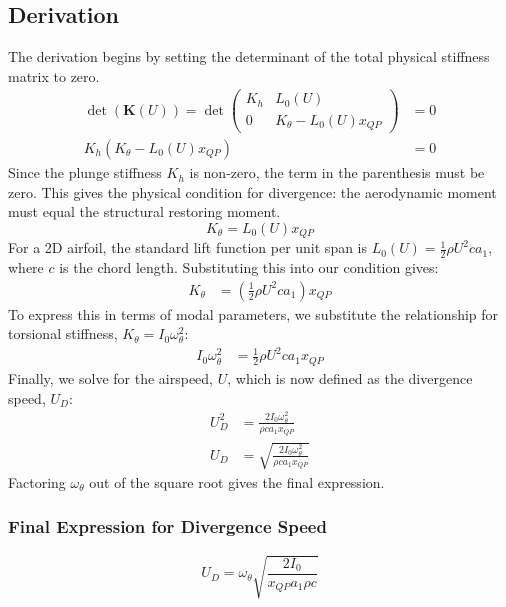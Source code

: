 \documentclass{article}
\begin{document}
\subsection{Derivation}
The derivation begins by setting the determinant of the total physical stiffness matrix to zero.
\begin{align*}
    \det(\mathbf{K}(U)) = \det \begin{pmatrix} K_h & L_0(U) \\ 0 & K_\theta - L_0(U) x_{QP} \end{pmatrix} &= 0 \\
    K_h(K_\theta - L_0(U) x_{QP}) &= 0
\end{align*}
Since the plunge stiffness $K_h$ is non-zero, the term in the parenthesis must be zero. This gives the physical condition for divergence: the aerodynamic moment must equal the structural restoring moment.
\begin{equation}
     K_\theta = L_0(U) x_{QP} \label{eq:divergence_condition_2}
\end{equation}
For a 2D airfoil, the standard lift function per unit span is $L_0(U) = \frac{1}{2}\rho U^2 c a_1$, where $c$ is the chord length. Substituting this into our condition gives:
\begin{align*}
    K_\theta &= \left(\frac{1}{2}\rho U^2 c a_1\right) x_{QP}
\end{align*}
To express this in terms of modal parameters, we substitute the relationship for torsional stiffness, $K_\theta = I_0 \omega_\theta^2$:
\begin{align*}
    I_0 \omega_\theta^2 &= \frac{1}{2}\rho U^2 c a_1 x_{QP}
\end{align*}
Finally, we solve for the airspeed, $U$, which is now defined as the divergence speed, $U_D$:
\begin{align*}
    U_D^2 &= \frac{2 I_0 \omega_\theta^2}{\rho c a_1 x_{QP}} \\
    U_D &= \sqrt{\frac{2 I_0 \omega_\theta^2}{\rho c a_1 x_{QP}}}
\end{align*}
Factoring $\omega_\theta$ out of the square root gives the final expression.

\subsubsection{Final Expression for Divergence Speed}
\begin{equation}
    \boxed{
    U_D = \omega_\theta \sqrt{\frac{2 I_0}{x_{QP} a_1 \rho c}}
    }
\end{equation}
\end{document}
